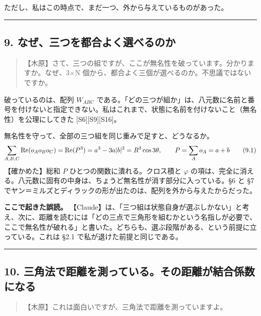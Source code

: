 \documentclass[
  a4paper,
]{ltjsarticle}
\begin{document}
ただし、私はこの時点で、まだ一つ、外から与えているものがあった。

\begin{center}\rule{0.5\linewidth}{0.5pt}\end{center}

\subsection{9.
なぜ、三つを都合よく選べるのか}\label{ux306aux305cux4e09ux3064ux3092ux90fdux5408ux3088ux304fux9078ux3079ux308bux306eux304b}

\begin{quote}
【木原】さて、三つの組ですが、ここが無名性を破っています。分かりますか。なぜ、3×N
個から、都合よく三個が選べるのか。不思議ではないですか。
\end{quote}

破っているのは、配列 \(W_{ABC}\)
である。「どの三つが組か」は、八元数に名前と番号を付けないと指定できない。私はこれまで、状態に名前を付けないこと（無名性）を公理にしてきた
{[}S6{]}{[}S9{]}{[}S16{]}。

無名性を守って、全部の三つ組を同じ重みで足すと、どうなるか。 \[
\sum_{A,B,C}{\rm Re}(o_Ao_Bo_C) = {\rm Re}(P^3) = a^3 - 3a\lvert b\rvert^2 = R^3\cos3\theta,\qquad P = \sum_A o_A = a + b \tag{9.1}
\] 【確かめた】総和 \(P\) ひとつの関数に潰れる。クロス積と \(\varphi\)
の項は、完全に消える。八元数に固有の中身は、ちょうど無名性が消す部分に入っている。§6
と §7
でヤン＝ミルズとディラックの形が出たのは、配列を外から与えたからだった。

\textbf{ここで起きた誤読。}
【Claude】は、「三つ組は状態自身が選ぶしかない」と考え、次に、距離を読むには「どの三点で三角形を組むかという名指しが必要で、ここで無名性が破れる」と書いた。どちらも、選ぶ段階がある、という前提に立っている。これは
§2.1 で私が退けた前提と同じである。

\begin{center}\rule{0.5\linewidth}{0.5pt}\end{center}

\subsection{10.
三角法で距離を測っている。その距離が結合係数になる}\label{ux4e09ux89d2ux6cd5ux3067ux8dddux96e2ux3092ux6e2cux3063ux3066ux3044ux308bux305dux306eux8dddux96e2ux304cux7d50ux5408ux4fc2ux6570ux306bux306aux308b}

\begin{quote}
【木原】これは面白いですが、三角法で距離を測っていますよ。
\end{quote}
\end{document}
